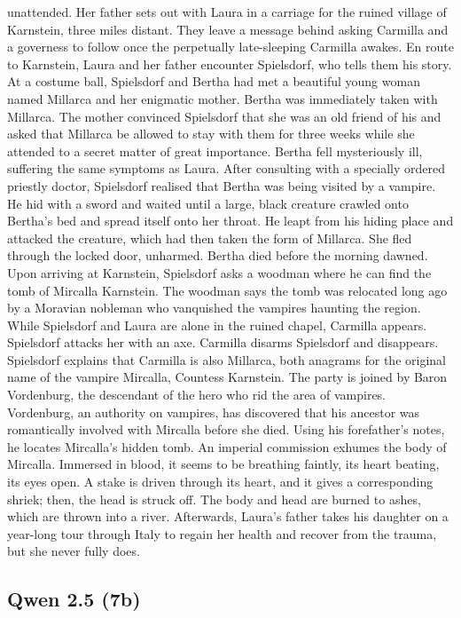 \documentclass{article} %
\begin{document}
unattended. Her father sets out with Laura in a carriage for the ruined village of Karnstein, three miles distant. They leave a message behind asking Carmilla and a governess to follow once the perpetually late-sleeping Carmilla awakes. En route to Karnstein, Laura and her father encounter Spielsdorf, who tells them his story. At a costume ball, Spielsdorf and Bertha had met a beautiful young woman named Millarca and her enigmatic mother. Bertha was immediately taken with Millarca. The mother convinced Spielsdorf that she was an old friend of his and asked that Millarca be allowed to stay with them for three weeks while she attended to a secret matter of great importance. Bertha fell mysteriously ill, suffering the same symptoms as Laura. \textcolor{skipred}{After consulting with a specially ordered priestly doctor, Spielsdorf realised that Bertha was being visited by a vampire. He hid with a sword and waited until a large, black creature crawled onto Bertha's bed and spread itself onto her throat. He leapt from his hiding place and attacked the creature, which had then taken the form of Millarca. She fled through the locked door, unharmed. Bertha died before the morning dawned.} Upon arriving at Karnstein, Spielsdorf asks a woodman where he can find the tomb of Mircalla Karnstein. The woodman says the tomb was relocated long ago by a Moravian nobleman who vanquished the vampires haunting the region. While Spielsdorf and Laura are alone in the ruined chapel, Carmilla appears. Spielsdorf attacks her with an axe. Carmilla disarms Spielsdorf and disappears. Spielsdorf explains that Carmilla is also Millarca, both anagrams for the original name of the vampire Mircalla, Countess Karnstein. The party is joined by Baron Vordenburg, the descendant of the hero who rid the area of vampires. Vordenburg, an authority on vampires, has discovered that his ancestor was romantically involved with Mircalla before she died. Using his forefather's notes, he locates Mircalla's hidden tomb. An imperial commission exhumes the body of Mircalla. Immersed in blood, it seems to be breathing faintly, its heart beating, its eyes open. A stake is driven through its heart, and it gives a corresponding shriek; then, the head is struck off. The body and head are burned to ashes, which are thrown into a river. Afterwards, Laura's father takes his daughter on a year-long tour through Italy to regain her health and recover from the trauma, but she never fully does.

\subsection{Qwen 2.5 (7b)}
\end{document}
